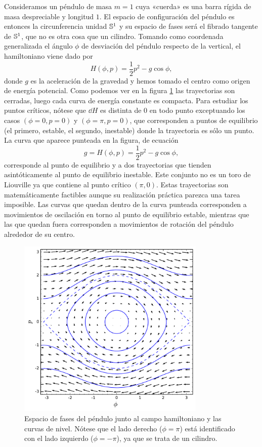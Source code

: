   Consideramos un péndulo de masa $m=1$ cuya «cuerda» es una barra rígida de masa despreciable y longitud $1$. El espacio de configuración del péndulo es entonces la circunferencia unidad $\mathbb{S}^1$ y su espacio de fases será el fibrado tangente de $\mathbb{S}^1$, que no es otra cosa que un cilindro. Tomando como coordenada generalizada el ángulo $\phi$ de desviación del péndulo respecto de la vertical, el hamiltoniano viene dado por 
  \begin{equation*}
    H(\phi,p)=\frac{1}{2}p^2 - g\cos\phi,
  \end{equation*}
  donde $g$ es la aceleración de la gravedad y hemos tomado el centro como origen de energía potencial.
  Como podemos ver en la figura \ref{fig:pendulo}  las trayectorias son cerradas, luego cada curva de energía constante es compacta. Para estudiar los puntos críticos, nótese que $\dd H$ es distinta de 0 en todo punto exceptuando los casos $(\phi=0,p=0)$ y $(\phi=\pi,p=0)$, que corresponden a puntos de equilibrio (el primero, estable, el segundo, inestable) donde la trayectoria es sólo un punto. La curva que aparece punteada en la figura, de ecuación
  \begin{equation*}
    g=H(\phi,p)=\frac{1}{2}p^2 - g \cos\phi ,
  \end{equation*}
   corresponde al punto de equilibrio y a dos trayectorias que tienden asintóticamente al punto de equilibrio inestable. Este conjunto no es un toro de Liouville ya que contiene al punto crítico $(\pi,0)$. Estas trayectorias son matemáticamente factibles aunque su realización práctica parezca una tarea imposible. Las curvas que quedan dentro de la curva punteada corresponden a movimientos de oscilación en torno al punto de equilibrio estable, mientras que las que quedan fuera corresponden a movimientos de rotación del péndulo alrededor de su centro. 
  \begin{figure}[h]
    \centering
    \includegraphics[width=0.8\textwidth]{pics/pendulo}
    \caption{\small Espacio de fases del péndulo junto al campo hamiltoniano y las curvas de nivel. Nótese que el lado derecho ($\phi=\pi$) está identificado con el lado izquierdo ($\phi=-\pi$), ya que se trata de un cilindro.}
    \label{fig:pendulo}
  \end{figure}

